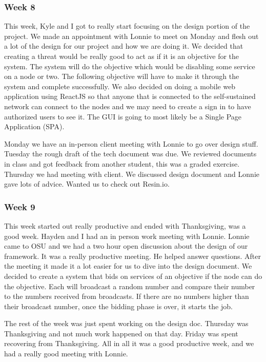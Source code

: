 \documentclass[draftclsnofoot, onecolumn, compsoc, 10pt]{IEEEtran}
\begin{document}
\subsubsection{Week 8}
This week, Kyle and I got to really start focusing on the design portion of the project. We made an appointment with Lonnie to meet on Monday and flesh out a lot of the design for our project and how we are doing it. We decided that creating a threat would be really good to act as if it is an objective for the system. The system will do the objective which would be disabling some service on a node or two. The following objective will have to make it through the system and complete successfully. We also decided on doing a mobile web application using ReactJS so that anyone that is connected to the self-sustained network can connect to the nodes and we may need to create a sign in to have authorized users to see it. The GUI is going to most likely be a Single Page Application (SPA).

Monday we have an in-person client meeting with Lonnie to go over design stuff. Tuesday the rough draft of the tech document was due. We reviewed documents in class and got feedback from another student, this was a graded exercise. Thursday we had meeting with client. We discussed design document and Lonnie gave lots of advice. Wanted us to check out Resin.io.

\subsubsection{Week 9}
This week started out really productive and ended with Thanksgiving, was a good week. Hayden and I had an in person work meeting with Lonnie. Lonnie came to OSU and we had a two hour open discussion about the design of our framework. It was a really productive meeting. He helped answer questions. After the meeting it made it a lot easier for us to dive into the design document. We decided to create a system that bids on services of an objective if the node can do the objective. Each will broadcast a random number and compare their number to the numbers received from broadcasts. If there are no numbers higher than their broadcast number, once the bidding phase is over, it starts the job.

The rest of the week was just spent working on the design doc. Thursday was Thanksgiving and not much work happened on that day. Friday was spent recovering from Thanksgiving. All in all it was a good productive week, and we had a really good meeting with Lonnie.
\end{document}
